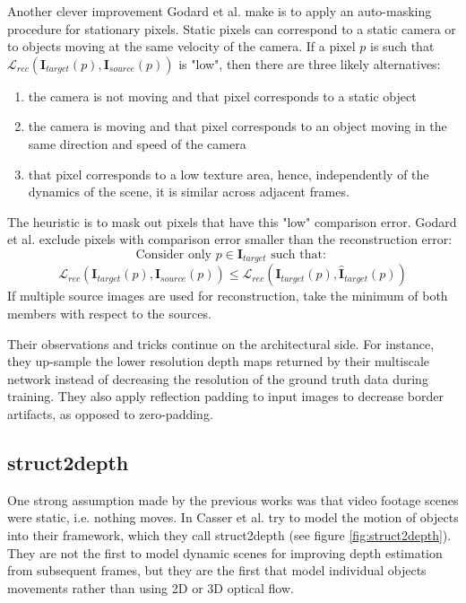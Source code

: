 Another clever improvement Godard et al. make is to apply an auto-masking procedure for stationary pixels.
Static pixels can correspond to a static camera or to objects moving at the same velocity of the camera.
If a pixel $p$ is such that $\mathcal{L}_{rec}(\mathbf{I}_{target}(p), \mathbf{I}_{source}(p))$ is "low", then there are three likely alternatives:
\begin{enumerate}
\item the camera is not moving and that pixel corresponds to a static object
\item the camera is moving and that pixel corresponds to an object moving in the same direction and speed of the camera
\item that pixel corresponds to a low texture area, hence, independently of the dynamics of the scene, it is similar across adjacent frames.
\end{enumerate}
The heuristic is to mask out pixels that have this "low" comparison error.
Godard et al. exclude pixels with comparison error smaller than the reconstruction error:
\[
	\text{Consider only } p \in \mathbf{I}_{target} \text{ such that: }
\]\[
	\mathcal{L}_{rec}(\mathbf{I}_{target}(p), \mathbf{I}_{source}(p))
		\leq
	\mathcal{L}_{rec}(\mathbf{I}_{target}(p), \hat{\mathbf{I}}_{target}(p))
\]
If multiple source images are used for reconstruction, take the minimum of both members with respect to the sources.

Their observations and tricks continue on the architectural side.
For instance, they up-sample the lower resolution depth maps returned by their multiscale network instead of decreasing the resolution of the ground truth data during training.
They also apply reflection padding to input images to decrease border artifacts, as opposed to zero-padding.

\subsection{struct2depth}
One strong assumption made by the previous works was that video footage scenes were static, i.e. nothing moves.
In \cite{struct2depth} Casser et al. try to model the motion of objects into their framework, which they call struct2depth (see figure \ref{fig:struct2depth}).
They are not the first to model dynamic scenes for improving depth estimation from subsequent frames, but they are the first that model individual objects movements rather than using 2D or 3D optical flow.

